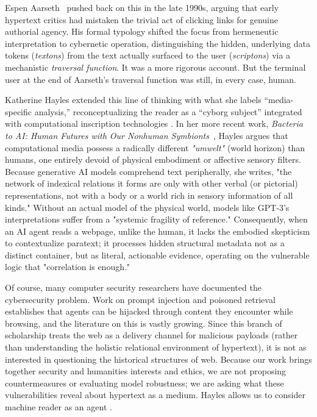 \documentclass[sigconf,authordraft]{acmart}
\begin{document}
Espen Aarseth~\cite{aarseth1997cybertext} pushed back on this in the late 1990s,
arguing that early hypertext critics had mistaken the trivial act of clicking
links for genuine authorial agency. His formal typology shifted the focus from
hermeneutic interpretation to cybernetic operation, distinguishing the hidden,
underlying data tokens (\textit{textons}) from the text actually surfaced to the
user (\textit{scriptons}) via a mechanistic \textit{traversal function}. It was
a more rigorous account. But the terminal user at the end of Aarseth's traversal
function was still, in every case, human.

Katherine Hayles extended this line of thinking with what she labels
``media-specific analysis,'' reconceptualizing the reader as a ``cyborg subject''
integrated with computational inscription technologies \cite{hayles2002writing}.
In her more recent work, \textit{Bacteria to AI: Human Futures with
Our Nonhuman Symbionts}~\cite{hayles2025bacteria}, Hayles argues that computational media possess a radically different \textit{"umwelt"} (world horizon) than humans, one entirely devoid of physical embodiment or affective sensory filters. Because generative AI models comprehend text peripherally, she writes, "the network
of indexical relations it forms are only with other verbal (or pictorial) representations, not with a body or a world rich in sensory information of all
kinds." Without an actual model of the physical world, models like GPT-3's interpretations suffer from a "systemic fragility of reference." Consequently, when an AI agent reads a webpage, unlike the human, it lacks the embodied skepticism to contextualize paratext; it processes hidden structural metadata not as a distinct container, but as literal, actionable evidence, operating on the vulnerable logic that "correlation is enough."

Of course, many computer security researchers have documented the cybersecurity problem. Work on prompt injection \cite{perez2022,greshake2023} and poisoned retrieval \cite{poisonedrag2024} establishes that agents can be hijacked through content they encounter while browsing, and the literature on this is vastly growing. Since this branch of scholarship treats the web as a delivery channel for malicious payloads (rather than understanding the holistic relational environment of hypertext), it is not as interested in questioning the historical structures of web. Because our work brings together security and humanities interests and ethics, we are not proposing countermeasures or evaluating model robustness; we are asking what these vulnerabilities reveal about hypertext as a medium. Hayles allows us to consider machine reader as an agent \cite{hayles2002writing}. 
\end{document}
